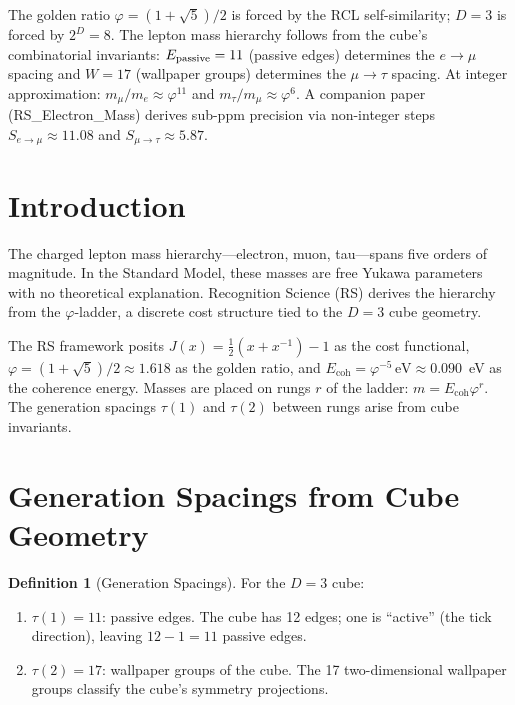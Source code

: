 \documentclass[12pt,a4paper]{article}
\theoremstyle{definition}
\newtheorem{definition}[theorem]{Definition}
\theoremstyle{remark}
\begin{document}
\noindent The golden ratio $\varphi=(1+\sqrt{5})/2$ is forced by the
RCL self-similarity; $D=3$ is forced by $2^D=8$.  The lepton mass
hierarchy follows from the cube's combinatorial invariants:
$E_{\rm passive}=11$ (passive edges) determines the $e\to\mu$ spacing
and $W=17$ (wallpaper groups) determines the $\mu\to\tau$ spacing.
At integer approximation: $m_\mu/m_e\approx\varphi^{11}$ and
$m_\tau/m_\mu\approx\varphi^6$.  A companion paper (RS\_Electron\_Mass)
derives sub-ppm precision via non-integer steps
$S_{e\to\mu}\approx11.08$ and $S_{\mu\to\tau}\approx5.87$.

\section{Introduction}
\label{sec:intro}

The charged lepton mass hierarchy---electron, muon, tau---spans
five orders of magnitude.  In the Standard Model, these masses are
free Yukawa parameters with no theoretical explanation.  Recognition
Science (RS) derives the hierarchy from the $\varphi$-ladder, a
discrete cost structure tied to the $D = 3$ cube geometry.

The RS framework posits $J(x) = \tfrac{1}{2}(x + x^{-1}) - 1$ as
the cost functional, $\varphi = (1+\sqrt{5})/2 \approx 1.618$ as the
golden ratio, and $E_{\mathrm{coh}} = \varphi^{-5}\,\mathrm{eV}
\approx 0.090$~eV as the coherence energy.  Masses are placed on
rungs $r$ of the ladder: $m = E_{\mathrm{coh}} \varphi^r$.  The
generation spacings $\tau(1)$ and $\tau(2)$ between rungs arise
from cube invariants.

\section{Generation Spacings from Cube Geometry}
\label{sec:generation-spacings}

\begin{definition}[Generation Spacings]
\label{def:tau}
For the $D = 3$ cube:
\begin{enumerate}[label=(\roman*)]
  \item $\tau(1) = 11$: passive edges.  The cube has 12 edges; one
  is ``active'' (the tick direction), leaving $12 - 1 = 11$ passive
  edges.
  \item $\tau(2) = 17$: wallpaper groups of the cube.  The 17
  two-dimensional wallpaper groups classify the cube's symmetry
  projections.
\end{enumerate}
\end{definition}
\end{document}
